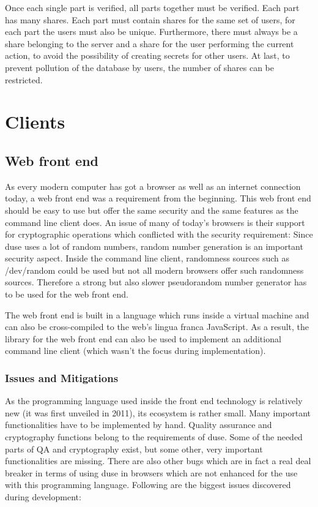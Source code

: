 Once each single part is verified, all parts together must be verified. Each
part has many shares. Each part must contain shares for the same set of users,
for each part the users must also be unique. Furthermore, there must always be
a share belonging to the server and a share for the user performing the current
action, to avoid the possibility of creating secrets for other users. At last,
to prevent pollution of the database by users, the number of shares can be
restricted.

\section{Clients}

\subsection{Web front end}

As every modern computer has got a browser as well as an internet connection today,
a web front end was a requirement from the beginning. This web front end should be
easy to use but offer the same security and the same features as the command line
client does. An issue of many of today's browsers is their support for
cryptographic operations which conflicted with the security requirement:
Since duse uses a lot of random numbers, random number generation is an important
security aspect. Inside the command line client, randomness sources such as
/dev/random could be used but not all modern browsers offer such randomness
sources. Therefore a strong but also slower pseudorandom number generator has
to be used for the web front end.

The web front end is built in a language which runs inside a virtual machine and
can also be cross-compiled to the web's lingua franca JavaScript. As a result,
the library for the web front end can also be used to implement an
additional command line client (which wasn't the focus during implementation).

\subsubsection{Issues and Mitigations}

As the programming language used inside the front end technology is relatively
new (it was first unveiled in 2011), its ecosystem is rather small. Many
important functionalities have to be implemented by hand. Quality assurance
and cryptography functions belong to the requirements of duse. Some of the
needed parts of QA and cryptography exist, but some other, very important
functionalities are missing. There are also other bugs which are in fact a
real deal breaker in terms of using duse in browsers which are not enhanced
for the use with this programming language. Following are the biggest issues
discovered during development:

